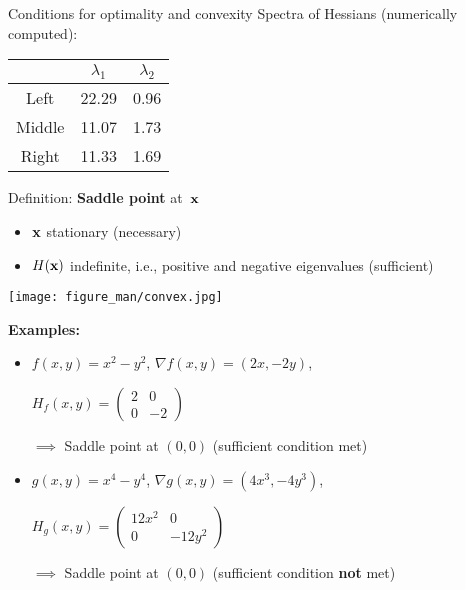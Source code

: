 \documentclass[11pt,compress,t,notes=noshow, xcolor=table]{beamer}
\begin{document}
\begin{vbframe}{Conditions for optimality and convexity}
Spectra of Hessians (numerically computed):

\begin{table}
    \centering
    \begin{tabular}{c|c|c}
               & $\lambda_1$ & $\lambda_2$ \\ \hline\hline
        Left   & 22.29       & 0.96        \\ \hline
        Middle & 11.07       & 1.73        \\ \hline
        Right  & 11.33       & 1.69
    \end{tabular}
\end{table}


\framebreak

Definition: \textbf{Saddle point} at~$\mathbf{x}$
\begin{itemize}
    \item $\mathbf{x}$ stationary (necessary)
    \item $H(\mathbf{x})$ indefinite, i.e., positive and negative eigenvalues (sufficient)
\end{itemize}

\lz

\begin{center}
    \texttt{[image: figure\_man/convex.jpg]}
\end{center}

\framebreak

\textbf{Examples:}

\lz

\begin{itemize}
    \item $f(x,y) = x^2 - y^2$, $\nabla f(x,y) = (2x,-2y)$,

        $H_f(x,y) = \begin{pmatrix}2 & 0 \\ 0 & -2\end{pmatrix}$

        $\implies$ Saddle point at $(0,0)$ (sufficient condition met)

    \vspace{\baselineskip}

    \item $g(x,y) = x^4 - y^4$, $\nabla g(x,y) = (4x^3,-4y^3)$,

        $H_g(x,y) = \begin{pmatrix}12x^2 & 0 \\ 0 & -12y^2\end{pmatrix}$

        $\implies$ Saddle point at $(0,0)$ (sufficient condition \textbf{not} met)
\end{itemize}

\end{vbframe}

\endlecture
\end{document}
